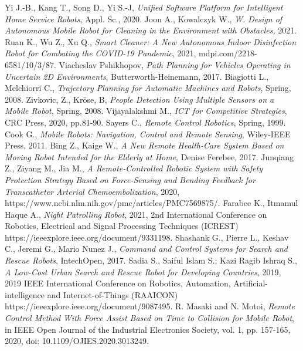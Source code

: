 \documentclass[noexaminfo,oneside,binding=0.6cm]{sapthesis}
\begin{document}
	\backmatter
	\cleardoublepage
	\begin{thebibliography}{bibl}
		Yi J.-B., Kang T., Song D., Yi S.-J,
		\emph{Unified Software Platform for Intelligent Home Service Robots}, Appl. Sc., 2020.
		Joon A., Kowalczyk W.,
		\emph{W. Design of Autonomous Mobile Robot for Cleaning in the Environment with Obstacles,} 2021. 
		Ruan K., Wu Z., Xu Q., \emph{Smart Cleaner: A New Autonomous Indoor Disinfection Robot for Combating the COVID-19 Pandemic}, 2021,  mdpi.com/2218-6581/10/3/87.
		Viacheslav Pshikhopov, \emph{Path Planning for Vehicles Operating in Uncertain 2D Environments}, Butterworth-Heinemann, 2017.
		Biagiotti L., Melchiorri C., \emph{Trajectory Planning for Automatic Machines and Robots}, Spring, 2008.
		Zivkovic, Z., Kröse, B, \emph{People Detection Using Multiple Sensors on a Mobile Robot}, Spring, 2008.
		Vijayalakshmi M.,
		\emph{ICT for Competitive Strategies}, CRC Press, 2020, pp.81-90.
		Sayers C.,
		\emph{Remote Control Robotics}, Spring, 1999.
		Cook G.,
		\emph{Mobile Robots: Navigation, Control and Remote Sensing}, Wiley-IEEE Press, 2011.
		Bing Z., Kaige W.,
		\emph{A New Remote Health-Care System Based on Moving Robot Intended for the Elderly at Home}, Denise Ferebee, 2017.
		Junqiang Z., Ziyang M., Jia M.,
		\emph{A Remote-Controlled Robotic System with Safety Protection Strategy Based on Force-Sensing and Bending Feedback for Transcatheter Arterial Chemoembolization}, 2020, https://www.ncbi.nlm.nih.gov/pmc/articles/PMC7569875/.
		Farabee K., Itmamul Haque A.,
		\emph{Night Patrolling Robot}, 2021, 2nd International Conference on Robotics, Electrical and Signal Processing Techniques (ICREST) https://ieeexplore.ieee.org/document/9331198.
		Shashank G., Pierre L.,  Keshav C., Jeremi G., Mario Nunez J.,
		\emph{Command and Control Systems for Search and Rescue Robots}, IntechOpen, 2017. 
		Sadia S., Saiful Islam S.; Kazi Ragib Ishraq S.,
		\emph{A Low-Cost Urban Search and Rescue Robot for Developing Countries}, 2019, 2019 IEEE International Conference on Robotics, Automation, Artificial-intelligence and Internet-of-Things (RAAICON) https://ieeexplore.ieee.org/document/9087495.
		R. Masaki and N. Motoi, 	\emph{Remote Control Method With Force Assist Based on Time to Collision for Mobile Robot}, in IEEE Open Journal of the Industrial Electronics Society, vol. 1, pp. 157-165, 2020, doi: 10.1109/OJIES.2020.3013249.

\end{thebibliography}
\end{document}
